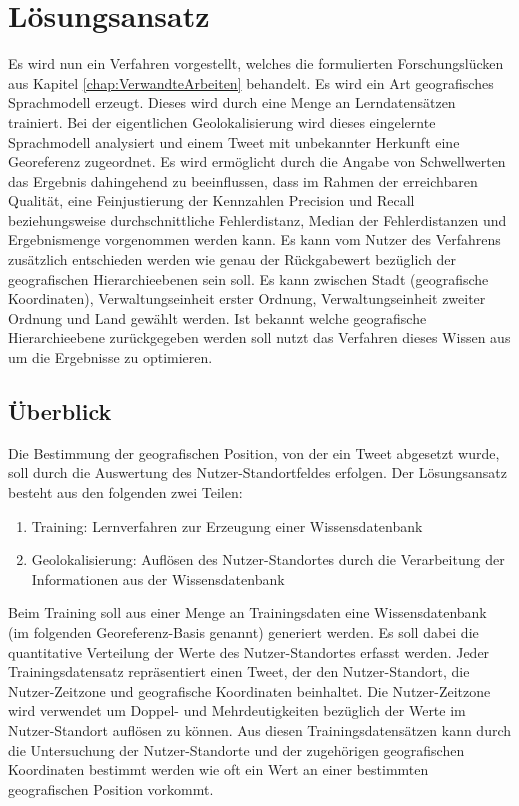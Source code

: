 \chapter{Lösungsansatz} \label{chp:Loesungsansatz}
		
	Es wird nun ein Verfahren vorgestellt, welches die formulierten Forschungslücken aus Kapitel \ref{chap:VerwandteArbeiten} behandelt.
	Es wird ein Art geografisches Sprachmodell erzeugt.
	Dieses wird durch eine Menge an Lerndatensätzen trainiert.
	Bei der eigentlichen Geolokalisierung wird dieses eingelernte Sprachmodell analysiert und einem Tweet mit unbekannter Herkunft eine Georeferenz zugeordnet.
	Es wird ermöglicht durch die Angabe von Schwellwerten das Ergebnis dahingehend zu beeinflussen, dass im Rahmen der erreichbaren Qualität, eine Feinjustierung der Kennzahlen Precision und Recall beziehungsweise durchschnittliche Fehlerdistanz, Median der Fehlerdistanzen und Ergebnismenge vorgenommen werden kann.
	Es kann vom Nutzer des Verfahrens zusätzlich entschieden werden wie genau der Rückgabewert bezüglich der geografischen Hierarchieebenen sein soll.
	Es kann zwischen Stadt (geografische Koordinaten), Verwaltungseinheit erster Ordnung, Verwaltungseinheit zweiter Ordnung und Land gewählt werden.
	Ist bekannt welche geografische Hierarchieebene zurückgegeben werden soll nutzt das Verfahren dieses Wissen aus um die Ergebnisse zu optimieren.  


	\section{Überblick} 

		Die Bestimmung der geografischen Position, von der ein Tweet abgesetzt wurde, soll durch die Auswertung des Nutzer-Standortfeldes erfolgen. 
		Der Lösungsansatz besteht aus den folgenden zwei Teilen:

		\begin{enumerate}
			\item Training: Lernverfahren zur Erzeugung einer Wissensdatenbank 
			\item Geolokalisierung: Auflösen des Nutzer-Standortes durch die Verarbeitung der Informationen aus der Wissensdatenbank
		\end{enumerate}

		Beim Training soll aus einer Menge an Trainingsdaten eine Wissensdatenbank (im folgenden Georeferenz-Basis genannt) generiert werden.
		Es soll dabei die quantitative Verteilung der Werte des Nutzer-Standortes erfasst werden.
		Jeder Trainingsdatensatz repräsentiert einen Tweet, der den Nutzer-Standort, die Nutzer-Zeitzone und geografische Koordinaten beinhaltet.
		Die Nutzer-Zeitzone wird verwendet um Doppel- und Mehrdeutigkeiten bezüglich der Werte im Nutzer-Standort auflösen zu können. 
		Aus diesen Trainingsdatensätzen kann durch die Untersuchung der Nutzer-Standorte und der zugehörigen geografischen Koordinaten bestimmt werden wie oft ein Wert an einer bestimmten geografischen Position vorkommt.

